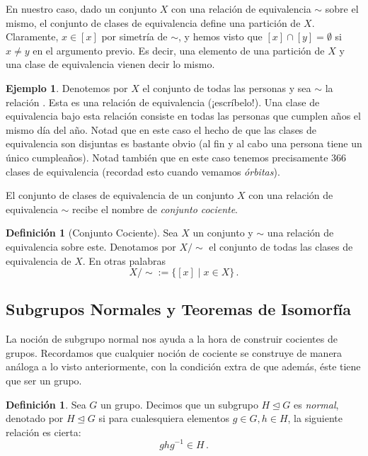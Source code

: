 \documentclass[a4paper,11pt]{amsart}
\theoremstyle{plain}
\theoremstyle{definition}
\newtheorem{defi}[thm]{Definición}
\newtheorem{ej}[thm]{Ejemplo}
\theoremstyle{remark}
\begin{document}
En nuestro caso, dado un conjunto $X$ con una relación de equivalencia $\sim$ sobre el mismo, el conjunto de clases de equivalencia define una partición de $X$. Claramente, $x \in [x]$ por simetría de $\sim$, y hemos visto que $[x] \cap [y] = \emptyset$ si $x \neq y$ en el argumento previo. Es decir, una elemento de una partición de $X$ y una clase de equivalencia vienen decir lo mismo.

\begin{ej}
Denotemos por $X$ el conjunto de todas las personas y sea $\sim$ la relación . Esta es una relación de equivalencia (¡escríbelo!). Una clase de equivalencia bajo esta relación consiste en todas las personas que cumplen años el mismo día del año. Notad que en este caso el hecho de que las clases de equivalencia son disjuntas es bastante obvio (al fin y al cabo una persona tiene un único cumpleaños). Notad también que en este caso tenemos precisamente $366$ clases de equivalencia (recordad esto cuando vemamos \textit{órbitas}).
\end{ej}


El conjunto de clases de equivalencia de un conjunto $X$ con una relación de equivalencia $\sim$ recibe el nombre de \textit{conjunto cociente}. 

\begin{defi}[Conjunto Cociente]
Sea $X$ un conjunto y $\sim$ una relación de equivalencia sobre este. Denotamos por $X/\sim$ el conjunto de todas las clases de equivalencia de $X$. En otras palabras 
\[ X/\sim := \{ [x] \mid x \in X\} \, .\]
\end{defi}


\subsection{Subgrupos Normales y Teoremas de Isomorfía}


La noción de subgrupo normal nos ayuda a la hora de construir cocientes de grupos. Recordamos que cualquier noción de cociente se construye de manera análoga a lo visto anteriormente, con la condición extra de que además, éste tiene que ser un grupo. 

\begin{defi}
Sea $G$ un grupo. Decimos que un subgrupo $H \unlhd G$ es \textit{normal}, denotado por $H \trianglelefteq G$ si para cualesquiera elementos $g \in G, h \in H$, la siguiente relación es cierta: 
\[ ghg^{-1} \in H \, . \]
\end{defi}
\end{document}
